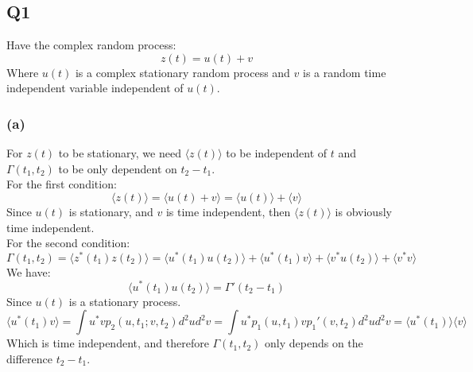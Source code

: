 \documentclass[../main.tex]{subfiles}
\begin{document}
\subsection{Q1}
Have the complex random process:
\begin{equation}
	z(t) = u(t) + v
\end{equation}
Where $u(t)$ is a complex stationary random process and $v$ is a random time independent variable independent of $u(t)$. 
\subsubsection{(a)}
For $z(t)$ to be stationary, we need $\langle z(t)\rangle$ to be independent of $t$ and $\Gamma(t_1, t_2)$ to be only dependent on $t_2-t_1$. \\
For the first condition:
\begin{equation}
	\langle z(t) \rangle = \langle u(t) + v\rangle = \langle u(t) \rangle + \langle v \rangle
\end{equation}
Since $u(t)$ is stationary, and $v$ is time independent, then $\langle z(t) \rangle$ is obviously time independent. \\
For the second condition:
\begin{equation}
	\Gamma (t_1, t_2) = \langle z^*(t_1)z(t_2) \rangle = \langle u^*(t_1)u(t_2) \rangle + \langle u^*(t_1)v \rangle + \langle v^*u(t_2) \rangle + \langle v^*v \rangle
\end{equation}
We have:
\begin{equation}
	\langle u^*(t_1)u(t_2) \rangle = \Gamma'(t_2-t_1)
\end{equation}
Since $u(t)$ is a stationary process.
\begin{equation}
	\langle u^*(t_1) v \rangle = \int u^* v p_2(u, t_1; v, t_2)d^2ud^2v = \int u^* p_1(u, t_1)vp_1'(v, t_2)d^2ud^2v = \langle u^*(t_1) \rangle \langle v \rangle
\end{equation}
Which is time independent, and therefore $\Gamma(t_1, t_2)$ only depends on the difference $t_2-t_1$.
\end{document}
